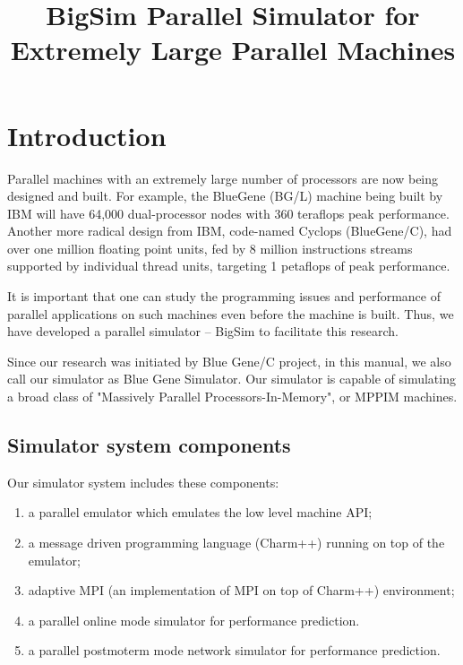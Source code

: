 \documentclass[10pt]{article}
\title{BigSim Parallel Simulator for Extremely Large Parallel Machines}
\begin{document}
\maketitle

\section{Introduction}


Parallel machines with an extremely large number of processors are now
being designed and built. For example, the BlueGene (BG/L) machine
being built by IBM will have 64,000 dual-processor nodes with 360 teraflops
peak performance. Another more radical design from IBM,
code-named Cyclops (BlueGene/C), had over one million floating point units,
fed by 8 million instructions streams supported by individual thread units,
targeting 1 petaflops of peak performance.


It is important that one can study the programming issues and performance
of parallel applications on such machines even before the machine is built.
Thus, we have developed a parallel simulator -- BigSim to facilitate this research.

Since our research was initiated by Blue Gene/C project, in this manual, 
we also call our simulator as Blue Gene Simulator.
Our simulator is capable of simulating a broad class of "Massively Parallel
Processors-In-Memory", or MPPIM machines. 

\subsection{Simulator system components}

Our simulator system includes these components: 
\begin{enumerate}
\item a parallel emulator which emulates the low level machine API; 
\item a message driven programming language (Charm++) running on top of the emulator; 
\item adaptive MPI (an implementation of MPI on top of Charm++) environment; 
\item a parallel online mode simulator for performance prediction. 
\item a parallel postmoterm mode network simulator for performance prediction. 
\end{enumerate}
\end{document}

